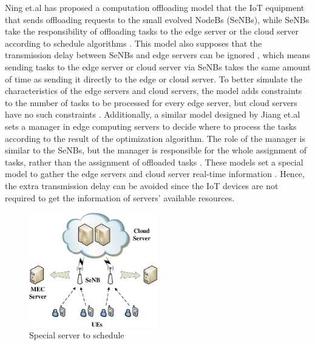 \documentclass[a4paper,11pt]{article}
\begin{document}
Ning et.al has proposed a computation offloading model that the IoT equipment that sends offloading requests to the small evolved NodeBs (SeNBs), while SeNBs take the responsibility of offloading tasks to the edge server or the cloud server according to schedule algorithms \cite{A_Cooperative_Partial_Computation_Offloading_Scheme_for_Mobile_Edge}. This model also supposes that the transmission delay between SeNBs and edge servers can be ignored \cite{A_Cooperative_Partial_Computation_Offloading_Scheme_for_Mobile_Edge}, which means sending tasks to the edge server or cloud server via SeNBs takes the same amount of time as sending it directly to the edge or cloud server. To better simulate the characteristics of the edge servers and cloud servers, the model adds constraints to the number of tasks to be processed for every edge server, but cloud servers have no such constraints \cite{A_Cooperative_Partial_Computation_Offloading_Scheme_for_Mobile_Edge}. Additionally, a similar model designed by Jiang et.al sets a manager in edge computing servers to decide where to process the tasks according to the result of the optimization algorithm. The role of the manager is similar to the SeNBs, but the manager is responsible for the whole assignment of tasks, rather than the assignment of offloaded tasks \cite{cloud_3_edgemanager}. These models set a special model to gather the edge servers and cloud server real-time information \cite{A_Cooperative_Partial_Computation_Offloading_Scheme_for_Mobile_Edge}. Hence, the extra transmission delay can be avoided since the IoT devices are not required to get the information of servers' available resources. \newline

\begin{figure}[h]
        \centering
        \includegraphics[width=0.5\textwidth]{SeNBs.png}
        \caption{Special server to schedule \cite{A_Cooperative_Partial_Computation_Offloading_Scheme_for_Mobile_Edge}}
\end{figure}
\end{document}
